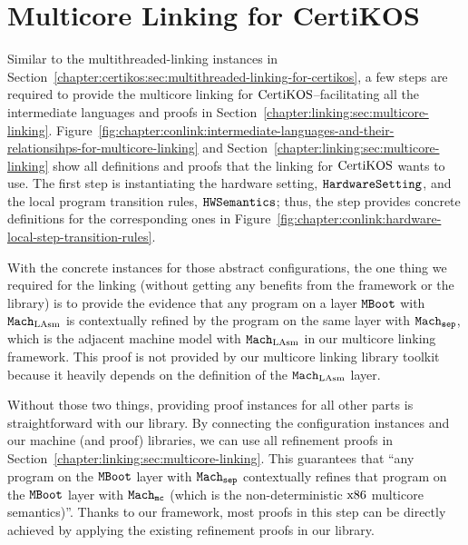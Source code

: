 \section{Multicore Linking for CertiKOS}
\label{chapter:certikos:sec:multicore-linking-for-certikos}


Similar to the multithreaded-linking instances in Section~\ref{chapter:certikos:sec:multithreaded-linking-for-certikos}, a few steps are required  to provide the multicore linking for $\mathrm{CertiKOS}$--facilitating all the intermediate languages
and proofs in Section~\ref{chapter:linking:sec:multicore-linking}.
Figure~\ref{fig:chapter:conlink:intermediate-languages-and-their-relationsihps-for-multicore-linking} and 
Section~\ref{chapter:linking:sec:multicore-linking} show all definitions and 
proofs that the linking for $\mathrm{CertiKOS}$ wants to use. 
The first step is instantiating the hardware setting, ${{\mathrm{\texttt{HardwareSetting}}}}$, and the local program transition rules, ${{\mathrm{\texttt{HWSemantics}}}}$;
thus, the step provides concrete definitions for the corresponding ones  
 in Figure~\ref{fig:chapter:conlink:hardware-local-step-transition-rules}.

With the concrete instances for those abstract configurations, 
the one thing  we required for the linking (without getting any benefits from the framework or the library)
is to provide the evidence that any program on a layer ${\mathrm{\texttt{MBoot}}}$  with ${\mathrm{\texttt{Mach}}}_{\mathrm{LAsm}}$ is contextually refined by the program on the same layer with ${{{\mathrm{\texttt{Mach}}}}_{{\mathrm{\texttt{sep}}}}}$, which is the adjacent machine model with ${\mathrm{\texttt{Mach}}}_{\mathrm{LAsm}}$ in our multicore linking framework. This proof is not provided by our multicore linking library toolkit because it heavily depends on the definition of the ${\mathrm{\texttt{Mach}}}_{\mathrm{LAsm}}$ layer.

Without those two things, providing proof instances for all other parts is straightforward with our library. 
By connecting the configuration instances and our machine (and proof) libraries, 
we can use all refinement proofs in Section~\ref{chapter:linking:sec:multicore-linking}. 
This guarantees that ``any program on the ${\mathrm{\texttt{MBoot}}}$ layer with ${{{\mathrm{\texttt{Mach}}}}_{{\mathrm{\texttt{sep}}}}}$ contextually refines that program on the ${\mathrm{\texttt{MBoot}}}$ layer with ${{{{\mathrm{\texttt{Mach}}}}_{\mathrm{\texttt{mc}}}}}$ (which is the non-deterministic $\mathrm{x86}$ multicore semantics)''.
Thanks to our framework, most proofs in this step can be directly achieved by applying the existing refinement proofs in our library.
%
